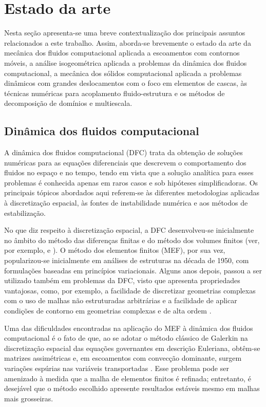 \section[Estado da Arte]{Estado da arte}\label{section:estado_da_arte}

Nesta seção apresenta-se uma breve contextualização dos principais assuntos relacionados a este trabalho. Assim, aborda-se brevemente o estado da arte da mecânica dos fluidos computacional aplicada a escoamentos com contornos móveis, a análise isogeométrica aplicada a problemas da dinâmica dos fluidos computacional, a mecânica dos sólidos computacional aplicada a problemas dinâmicos com grandes deslocamentos com o foco em elementos de cascas, às técnicas numéricas para acoplamento fluido-estrutura e os métodos de decomposição de domínios e multiescala. 

\subsection{Dinâmica dos fluidos computacional}
\label{cfd}

A dinâmica dos fluidos computacional (DFC) trata da obtenção de soluções numéricas para as  equações diferenciais que descrevem o comportamento dos fluidos no espaço e no tempo, tendo em vista que a solução analítica para esses problemas é conhecida apenas em raros casos e sob hipóteses simplificadoras. Os principais tópicos abordados aqui referem-se às diferentes metodologias aplicadas à discretização espacial, às fontes de instabilidade numérica e aos métodos de estabilização.

No que diz respeito à discretização espacial, a DFC desenvolveu-se inicialmente no âmbito do método das diferenças finitas e do método dos volumes finitos (ver, por exemplo,  e ). O método dos elementos finitos (MEF), por sua vez, popularizou-se inicialmente em análises de estruturas na década de 1950, com formulações baseadas em princípios variacionais. Alguns anos depois, passou a ser utilizado também em problemas da DFC, visto que apresenta propriedades vantajosas, como, por exemplo, a facilidade de discretizar geometrias complexas com o uso de malhas não estruturadas arbitrárias e a facilidade de aplicar condições de contorno em geometrias complexas e de alta ordem \cite{ReddyG:2000,ZienkiewiczTN:2005a}.

Uma das dificuldades encontradas na aplicação do MEF à dinâmica dos fluidos computacional é o fato de que, ao se adotar o método clássico de Galerkin na discretização espacial das equações governantes em descrição Euleriana, obtêm-se matrizes assimétricas e, em escoamentos com convecção dominante, surgem variações espúrias nas variáveis transportadas \cite{BrooksH:1982,ZienkiewiczTN:2005a}. Esse problema pode ser amenizado à medida que a malha de elementos finitos é refinada; entretanto, é desejável que o método escolhido apresente resultados estáveis mesmo em malhas mais grosseiras.

